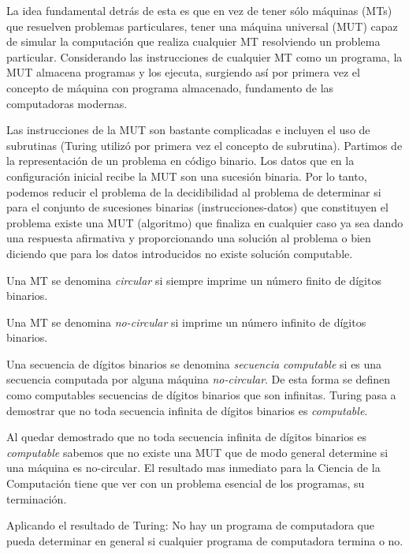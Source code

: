 \documentclass[]{article}
\begin{document}
La idea fundamental detr\'as de esta es que en vez de tener s\'olo m\'aquinas (MTs) que resuelven problemas particulares, tener una m\'aquina universal (MUT) 
capaz de simular la computaci\'on que realiza cualquier MT resolviendo un problema particular. Considerando las instrucciones de cualquier MT como un programa, la MUT almacena programas y los ejecuta, surgiendo as\'i por primera vez el concepto de m\'aquina con programa almacenado, fundamento de las computadoras modernas.

Las instrucciones de la MUT son bastante complicadas e incluyen el uso de subrutinas (Turing utiliz\'o por primera vez el concepto de subrutina). Partimos de la representaci\'on de un problema en c\'odigo binario. Los datos que en la configuraci\'on inicial recibe la MUT son una sucesi\'on binaria. Por lo tanto, podemos reducir el problema de la decidibilidad al problema de determinar si para el conjunto de sucesiones binarias (instrucciones-datos) que constituyen el problema existe una MUT (algoritmo) que finaliza en cualquier caso ya sea dando una respuesta afirmativa y proporcionando una solución al problema o bien diciendo que para los datos introducidos no existe soluci\'on computable.

Una MT se denomina \textit{circular} si siempre imprime un n\'umero finito de d\'igitos binarios.

Una MT se denomina \textit{no-circular} si imprime un n\'umero infinito de d\'igitos binarios.

Una secuencia de d\'igitos binarios se denomina \textit{secuencia computable} si es una secuencia computada por alguna m\'aquina \textit{no-circular}. De esta forma se definen como computables secuencias 
de d\'igitos binarios que son infinitas. Turing pasa a demostrar que no toda secuencia infinita de d\'igitos binarios es \textit{computable}.


Al quedar demostrado que no toda secuencia infinita de d\'igitos binarios es \textit{computable} sabemos que no existe una MUT que de modo general determine si una m\'aquina es no-circular. El resultado mas inmediato para la Ciencia de la Computaci\'on tiene 
que ver con un problema esencial de los programas, su terminaci\'on.

Aplicando el resultado de Turing: 
No hay un programa de computadora que pueda determinar en  general si cualquier programa de computadora termina o no.


\end{document}
